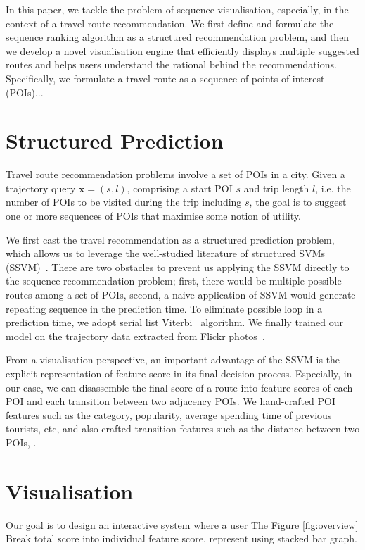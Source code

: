 \documentclass[sigconf]{acmart}
\begin{document}
In this paper, we tackle the problem of sequence visualisation, especially, in the context of a travel route recommendation. We first define and formulate the sequence ranking algorithm as a structured recommendation problem, and then we develop a novel visualisation engine that efficiently displays multiple suggested routes and helps users understand the rational behind the recommendations. Specifically, we formulate a travel route as a sequence of points-of-interest (POIs)...

\section{Structured Prediction}
Travel route recommendation problems involve a set of POIs in a city. Given a trajectory query $\mathbf{x} = (s, l)$, comprising a start POI $s$ and trip length $l$, i.e. the number of POIs to be visited during the trip including $s$, the goal is to suggest one or more sequences of POIs that maximise some notion of utility.

We first cast the travel recommendation as a structured prediction problem, which allows us to leverage the well-studied literature of structured SVMs (SSVM)~\cite{tsochantaridis2005large,joachims2009predicting}. There are two obstacles to prevent us applying the SSVM directly to the sequence recommendation problem; first, there would be multiple possible routes among a set of POIs, second, a naive application of SSVM would generate repeating sequence in the prediction time. 
To eliminate possible loop in a prediction time, we adopt serial list Viterbi~\cite{seshadri1994list,nill1995list} algorithm.
We finally trained our model on the trajectory data extracted from Flickr photos~\cite{chen2016learning}.

From a visualisation perspective, an important advantage of the SSVM is the explicit representation of feature score in its final decision process. Especially, in our case, we can disassemble the final score of a route into feature scores of each POI and each transition between two adjacency POIs. We hand-crafted POI features such as the category, popularity, average spending time of previous tourists, etc, and also crafted transition features such as the distance between two POIs, .

\section{Visualisation}
Our goal is to design an interactive system where a user 
The Figure \ref{fig:overview}
Break total score into individual feature score, represent using stacked bar graph.
\end{document}
